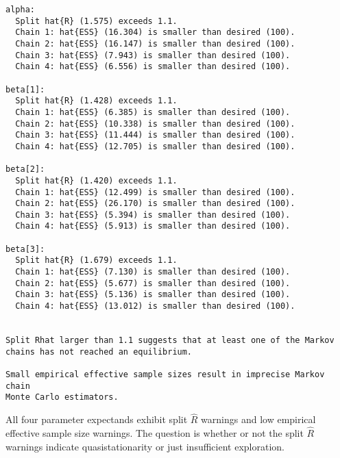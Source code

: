\documentclass[
  letterpaper,
  DIV=11,
  numbers=noendperiod]{scrartcl}
\newenvironment{Shaded}{\begin{snugshade}}{\end{snugshade}}
\newcommand{\ConstantTok}[1]{\textcolor[rgb]{0.56,0.35,0.01}{#1}}
\newcommand{\FunctionTok}[1]{\textcolor[rgb]{0.28,0.35,0.67}{#1}}
\newcommand{\NormalTok}[1]{\textcolor[rgb]{0.00,0.23,0.31}{#1}}
\newcommand{\OtherTok}[1]{\textcolor[rgb]{0.00,0.23,0.31}{#1}}
\newcommand{\SpecialCharTok}[1]{\textcolor[rgb]{0.37,0.37,0.37}{#1}}
\newcommand{\StringTok}[1]{\textcolor[rgb]{0.13,0.47,0.30}{#1}}
\begin{document}
\begin{Shaded}
\end{Shaded}

\begin{verbatim}
alpha:
  Split hat{R} (1.575) exceeds 1.1.
  Chain 1: hat{ESS} (16.304) is smaller than desired (100).
  Chain 2: hat{ESS} (16.147) is smaller than desired (100).
  Chain 3: hat{ESS} (7.943) is smaller than desired (100).
  Chain 4: hat{ESS} (6.556) is smaller than desired (100).

beta[1]:
  Split hat{R} (1.428) exceeds 1.1.
  Chain 1: hat{ESS} (6.385) is smaller than desired (100).
  Chain 2: hat{ESS} (10.338) is smaller than desired (100).
  Chain 3: hat{ESS} (11.444) is smaller than desired (100).
  Chain 4: hat{ESS} (12.705) is smaller than desired (100).

beta[2]:
  Split hat{R} (1.420) exceeds 1.1.
  Chain 1: hat{ESS} (12.499) is smaller than desired (100).
  Chain 2: hat{ESS} (26.170) is smaller than desired (100).
  Chain 3: hat{ESS} (5.394) is smaller than desired (100).
  Chain 4: hat{ESS} (5.913) is smaller than desired (100).

beta[3]:
  Split hat{R} (1.679) exceeds 1.1.
  Chain 1: hat{ESS} (7.130) is smaller than desired (100).
  Chain 2: hat{ESS} (5.677) is smaller than desired (100).
  Chain 3: hat{ESS} (5.136) is smaller than desired (100).
  Chain 4: hat{ESS} (13.012) is smaller than desired (100).


Split Rhat larger than 1.1 suggests that at least one of the Markov
chains has not reached an equilibrium.

Small empirical effective sample sizes result in imprecise Markov chain
Monte Carlo estimators.
\end{verbatim}

All four parameter expectands exhibit split \(\hat{R}\) warnings and low
empirical effective sample size warnings. The question is whether or not
the split \(\hat{R}\) warnings indicate quasistationarity or just
insufficient exploration.
\end{document}
